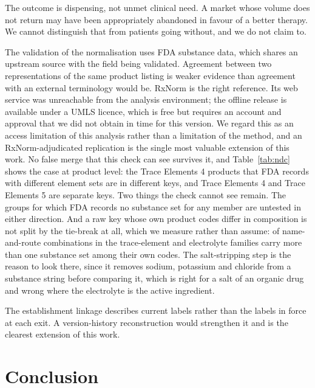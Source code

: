 \documentclass[pdflatex,sn-vancouver-num,Numbered]{sn-jnl}
\begin{document}
The outcome is dispensing, not unmet clinical need. A market whose volume does not return may
have been appropriately abandoned in favour of a better therapy. We cannot distinguish that from
patients going without, and we do not claim to.

The validation of the normalisation uses FDA substance data, which shares an upstream source
with the field being validated. Agreement between two representations of the same product
listing is weaker evidence than agreement with an external terminology would be. RxNorm is the
right reference. Its web service was unreachable from the analysis environment; the offline
release is available under a UMLS licence, which is free but requires an account and approval
that we did not obtain in time for this version. We regard this as an access limitation of this
analysis rather than a limitation of the method, and an RxNorm-adjudicated replication is the
single most valuable extension of this work. No false merge that this check can see survives it, and
Table~\ref{tab:ndc} shows the case at product level: the Trace Elements 4 products that FDA
records with different element sets are in different keys, and Trace Elements 4 and Trace
Elements 5 are separate keys. Two things the check cannot see remain. The \nUntestable groups for
which FDA records no substance set for any member are untested in either direction. And a raw key
whose own product codes differ in composition is not split by the tie-break at all, which we
measure rather than assume: \nNdcMulti of \nNdcCombos name-and-route combinations in the
trace-element and electrolyte families carry more than one substance set among their own codes.
The salt-stripping step is the reason to look there, since it removes sodium, potassium and
chloride from a substance string before comparing it, which is right for a salt of an organic
drug and wrong where the electrolyte is the active ingredient.

The establishment linkage describes current labels rather than the labels in force at each exit.
A version-history reconstruction would strengthen it and is the clearest extension of this work.

\section{Conclusion}\label{sec:conclusion}
\end{document}
